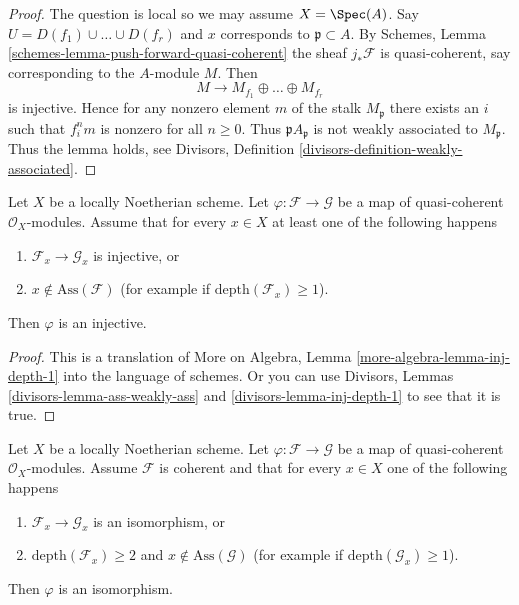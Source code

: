 \begin{proof}
The question is local so we may assume $X = \Spec(A)$.
Say $U = D(f_1) \cup \ldots \cup D(f_r)$ and $x$
corresponds to $\mathfrak p \subset A$.
By Schemes, Lemma \ref{schemes-lemma-push-forward-quasi-coherent}
the sheaf $j_*\mathcal{F}$ is quasi-coherent, say corresponding
to the $A$-module $M$. Then
$$
M \to M_{f_1} \oplus \ldots \oplus M_{f_r}
$$
is injective. Hence for any nonzero element $m$ of the stalk $M_\mathfrak p$
there exists an $i$ such that $f_i^n m$ is nonzero for all $n \geq 0$.
Thus $\mathfrak pA_\mathfrak p$ is not weakly associated to $M_\mathfrak p$.
Thus the lemma holds, see Divisors, Definition
\ref{divisors-definition-weakly-associated}.
\end{proof}

\begin{lemma}
\label{lemma-inj-depth-1}
Let $X$ be a locally Noetherian scheme. Let
$\varphi : \mathcal{F} \to \mathcal{G}$ be a map of
quasi-coherent $\mathcal{O}_X$-modules.
Assume that for every $x \in X$
at least one of the following happens
\begin{enumerate}
\item $\mathcal{F}_x \to \mathcal{G}_x$ is injective, or
\item $x \not \in \text{Ass}(\mathcal{F})$ (for example if
$\text{depth}(\mathcal{F}_x) \geq 1$).
\end{enumerate}
Then $\varphi$ is an injective.
\end{lemma}

\begin{proof}
This is a translation of More on Algebra, Lemma
\ref{more-algebra-lemma-inj-depth-1} into the language of schemes.
Or you can use Divisors, Lemmas \ref{divisors-lemma-ass-weakly-ass} and
\ref{divisors-lemma-inj-depth-1}
to see that it is true.
\end{proof}

\begin{lemma}
\label{lemma-isom-depth-2}
Let $X$ be a locally Noetherian scheme. Let
$\varphi : \mathcal{F} \to \mathcal{G}$ be a map of
quasi-coherent $\mathcal{O}_X$-modules. Assume $\mathcal{F}$ is coherent
and that for every $x \in X$ one of the following happens
\begin{enumerate}
\item $\mathcal{F}_x \to \mathcal{G}_x$ is an isomorphism, or
\item $\text{depth}(\mathcal{F}_x) \geq 2$ and
$x \not \in \text{Ass}(\mathcal{G})$ (for example if
$\text{depth}(\mathcal{G}_x) \geq 1$).
\end{enumerate}
Then $\varphi$ is an isomorphism.
\end{lemma}

